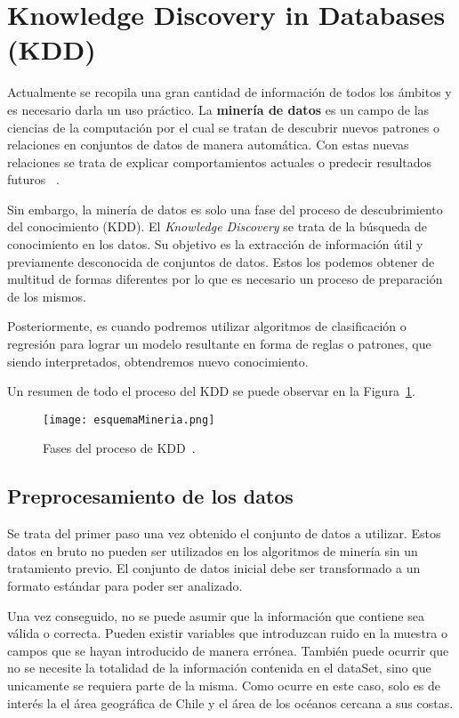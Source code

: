 \section{Knowledge Discovery in Databases (KDD)}

Actualmente se recopila una gran cantidad de información de todos los ámbitos y es necesario darla un uso práctico. La \textbf{minería de datos} es un campo de las ciencias de la computación por el cual se tratan de descubrir nuevos patrones o relaciones en conjuntos de datos de manera automática. Con estas nuevas relaciones se trata de explicar comportamientos actuales o predecir resultados futuros~ \cite{mineria_tecnicas_herramientas}. 

Sin embargo, la minería de datos es solo una fase del proceso de descubrimiento del conocimiento (KDD). El \emph{Knowledge Discovery} se trata de la búsqueda de conocimiento en los datos. Su objetivo es la extracción de información útil y previamente desconocida de conjuntos de datos. Estos los podemos obtener de multitud de formas diferentes por lo que es necesario un proceso de preparación de los mismos.

Posteriormente, es cuando podremos utilizar algoritmos de clasificación o regresión para lograr un modelo resultante en forma de reglas o patrones, que siendo interpretados, obtendremos nuevo conocimiento.

Un resumen de todo el proceso del KDD se puede observar en la Figura~\ref{fasesKDD}.

\begin{figure}[!h]
	\centering
	\texttt{[image: esquemaMineria.png]}
	\caption[Fases del proceso de KDD]{Fases del proceso de KDD~\cite{mineria_tecnicas_herramientas}.}
	\label{fasesKDD}
\end{figure}


\subsection{Preprocesamiento de los datos}
Se trata del primer paso una vez obtenido el conjunto de datos a utilizar. Estos datos en bruto no pueden ser utilizados en los algoritmos de minería sin un tratamiento previo. El conjunto de datos inicial debe ser transformado a un formato estándar para poder ser analizado.

Una vez conseguido, no se puede asumir que la información que contiene sea válida o correcta. Pueden existir variables que introduzcan ruido en la muestra o campos que se hayan introducido de manera errónea. También puede ocurrir que no se necesite la totalidad de la información contenida en el dataSet, sino que unicamente se requiera parte de la misma. Como ocurre en este caso, solo es de interés la el área geográfica de Chile y el área de los océanos cercana a sus costas.

